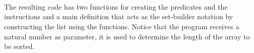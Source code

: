 \begin{code}
    \>[0]\AgdaSpace{}%
    \AgdaSymbol{:}\AgdaSpace{}%
    \AgdaSpace{}%
    \AgdaSpace{}%
    \AgdaSpace{}%
    \<%
    \\
    \>[0]\AgdaSpace{}%
    \AgdaSpace{}%
    \AgdaSymbol{=}\AgdaSpace{}%
    \AgdaSpace{}%
    \<%
    \\
    \\[\AgdaEmptyExtraSkip]%
    \>[0]\AgdaSpace{}%
    \AgdaSpace{}%
    \AgdaSpace{}%
    \AgdaSymbol{=}\AgdaSpace{}%
    \AgdaSpace{}%
    \AgdaSpace{}%
    \<%
\end{code}

The resulting code has two functions for creating the predicates and the instructions and a main definition that acts as the set-builder notation by constructing the list using the functions. Notice that the program receives a natural number as parameter, it is used to determine the length of the array to be sorted.

